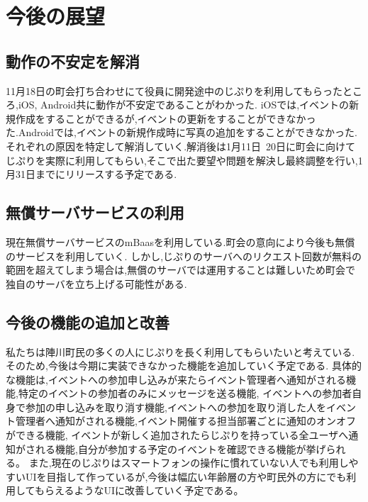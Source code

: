 \chapter{今後の展望}

\section{動作の不安定を解消}
11月18日の町会打ち合わせにて役員に開発途中のじぷりを利用してもらったところ,iOS, Android共に動作が不安定であることがわかった.
iOSでは,イベントの新規作成をすることができるが,イベントの更新をすることができなかった.Androidでは,イベントの新規作成時に写真の追加をすることができなかった.
それぞれの原因を特定して解消していく.解消後は1月11日~20日に町会に向けてじぷりを実際に利用してもらい,そこで出た要望や問題を解決し最終調整を行い,1月31日までにリリースする予定である.

\section{無償サーバサービスの利用}
現在無償サーバサービスのmBaasを利用している.町会の意向により今後も無償のサービスを利用していく.
しかし,じぷりのサーバへのリクエスト回数が無料の範囲を超えてしまう場合は,無償のサーバでは運用することは難しいため町会で独自のサーバを立ち上げる可能性がある.

\section{今後の機能の追加と改善}
私たちは陣川町民の多くの人にじぷりを長く利用してもらいたいと考えている.
そのため,今後は今期に実装できなかった機能を追加していく予定である.
具体的な機能は,イベントへの参加申し込みが来たらイベント管理者へ通知がされる機能,特定のイベントの参加者のみにメッセージを送る機能,
イベントへの参加者自身で参加の申し込みを取り消す機能,イベントへの参加を取り消した人をイベント管理者へ通知がされる機能,イベント開催する担当部署ごとに通知のオンオフができる機能,
イベントが新しく追加されたらじぷりを持っている全ユーザへ通知がされる機能,自分が参加する予定のイベントを確認できる機能が挙げられる。
また,現在のじぷりはスマートフォンの操作に慣れていない人でも利用しやすいUIを目指して作っているが,今後は幅広い年齢層の方や町民外の方にでも利用してもらえるようなUIに改善していく予定である。
